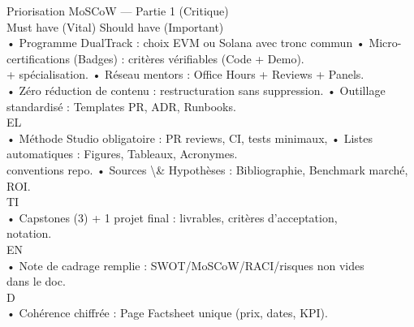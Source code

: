\documentclass[12pt,landscape,a4paper]{article}
\begin{document}
Priorisation MoSCoW — Partie 1 (Critique)\\
\vspace{0.5em}
\vspace{0.5em}
Must have (Vital)                                                       Should have (Important)\\
• Programme DualTrack : choix EVM ou Solana avec tronc commun           • Micro-certifications (Badges) : critères vérifiables (Code + Demo).\\
+ spécialisation.                                                       • Réseau mentors : Office Hours + Reviews + Panels.\\
• Zéro réduction de contenu : restructuration sans suppression.         • Outillage standardisé : Templates PR, ADR, Runbooks.\\
\vspace{0.5em}
\vspace{0.5em}
\vspace{0.5em}
\vspace{0.5em}
EL\\
• Méthode Studio obligatoire : PR reviews, CI, tests minimaux,          • Listes automatiques : Figures, Tableaux, Acronymes.\\
conventions repo.                                                       • Sources \textbackslash{}& Hypothèses : Bibliographie, Benchmark marché, ROI.\\
\vspace{0.5em}
\vspace{0.5em}
\vspace{0.5em}
\vspace{0.5em}
TI\\
• Capstones (3) + 1 projet final : livrables, critères d’acceptation,\\
notation.\\
\vspace{0.5em}
\vspace{0.5em}
\vspace{0.5em}
\vspace{0.5em}
EN\\
• Note de cadrage remplie : SWOT/MoSCoW/RACI/risques non vides\\
dans le doc.\\
\vspace{0.5em}
\vspace{0.5em}
\vspace{0.5em}
\vspace{0.5em}
D\\
• Cohérence chiffrée : Page Factsheet unique (prix, dates, KPI).\\
\end{document}
